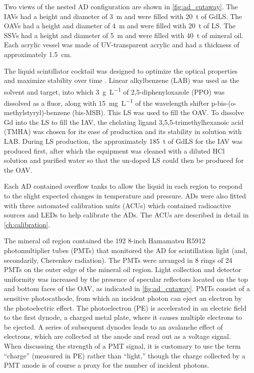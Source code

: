 Two views of the nested AD configuration are shown in \cref{fig:ad_cutaway}.
The IAVs had a height and diameter of \SI{3}{\m} and were filled with \SI{20}{\tonne}
of GdLS.
The OAVs had a height and diameter of \SI{4}{\m} and were filled with \SI{20}{\tonne}
of LS.
The SSVs had a height and diameter of \SI{5}{\m} and were filled with \SI{40}{\tonne}
of mineral oil.
Each acrylic vessel was made of UV-transparent acrylic
and had a thickness of approximately \SI{1.5}{\cm}.

The liquid scintillator cocktail was designed to optimize the optical properties
and maximize stability over time \cite{gdls2014}.
Linear alkylbenzene (LAB) was used as the solvent and \nuebar{} target,
into which \SI{3}{\g\per\liter} of 2,5-diphenyloxazole (PPO)
was dissolved as a fluor,
along with \SI{15}{\mg\per\liter} of the wavelength shifter
p-bis-(o-methylstyryl)-benzene (bis-MSB).
This LS was used to fill the OAV.
To dissolve Gd into the LS to fill the IAV, the chelating ligand
3,5,5-trimethylhexanoic acid (TMHA) was chosen for its ease of production
and its stability in solution with LAB.
During LS production, the approximately \SI{185}{\tonne} of GdLS for the IAV
was produced first,
after which the equipment was cleaned with a diluted HCl solution and purified water
so that the un-doped LS could then be produced for the OAV.

Each AD contained overflow tanks to allow the liquid in each region
to respond to the slight expected changes in temperature and pressure.
ADs were also fitted with three automated calibration units (ACUs)
which contained radioactive sources and LEDs to help calibrate the ADs.
The ACUs are described in detail in \cref{ch:calibration}.

The mineral oil region contained the 192 8-inch Hamamatsu R5912
photomultiplier tubes (PMTs) that monitored the AD for scintillation light
(and, secondarily, Cherenkov radiation).
The PMTs were arranged in 8 rings of 24 PMTs on the outer edge of the mineral oil region.
Light collection and detector uniformity was increased by the presence of
specular reflectors located on the top and bottom faces of the OAV,
as indicated in \cref{fig:ad_cutaway}.
PMTs consist of a sensitive photocathode, from which an incident photon
can eject an electron by the photoelectric effect.
The photoelectron (PE) is accelerated in an electric field to the first dynode,
a charged metal plate, where it causes multiple electrons to be ejected.
A series of subsequent dynodes leads to an avalanche effect of electrons,
which are collected at the anode and read out as a voltage signal.
When discussing the strength of a PMT signal,
it is customary to use the term ``charge'' (measured in PE)
rather than ``light,''
though the charge collected by a PMT anode
is of course a proxy for the number of incident photons.

